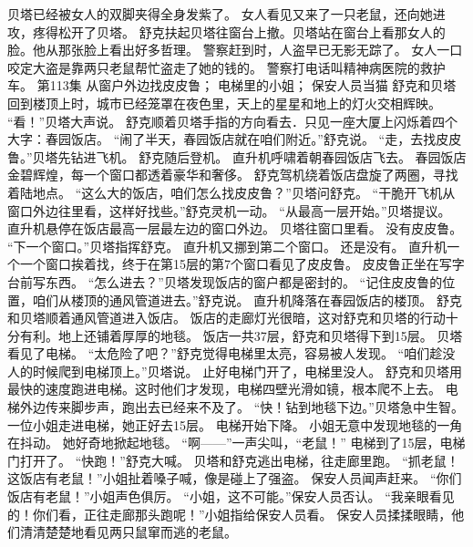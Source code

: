 \documentclass[a4paper,12pt,UTF8,twoside]{ctexbook}
\begin{document}
        贝塔已经被女人的双脚夹得全身发紫了。 
        女人看见又来了一只老鼠，还向她进攻，疼得松开了贝塔。 
        舒克扶起贝塔往窗台上撤。贝塔站在窗台上看那女人的脸。他从那张脸上看出好多哲理。 
        警察赶到时，人盗早已无影无踪了。 
        女人一口咬定大盗是靠两只老鼠帮忙盗走了她的钱的。 
        警察打电话叫精神病医院的救护车。   第113集 
        从窗户外边找皮皮鲁； 
        电梯里的小姐； 
        保安人员当猫   
        舒克和贝塔回到楼顶上时，城市已经笼罩在夜色里，天上的星星和地上的灯火交相辉映。 
        “看！”贝塔大声说。 
        舒克顺着贝塔手指的方向看去．只见一座大厦上闪烁着四个大字：春园饭店。 
        “闹了半天，春园饭店就在咱们附近。”舒克说。 
        “走，去找皮皮鲁。”贝塔先钻进飞机。 
        舒克随后登机。 
        直升机呼啸着朝春园饭店飞去。 
        春园饭店金碧辉煌，每一个窗口都透着豪华和奢侈。 
        舒克驾机绕着饭店盘旋了两圈，寻找着陆地点。 
        “这么大的饭店，咱们怎么找皮皮鲁？”贝塔问舒克。 
        “干脆开飞机从窗口外边往里看，这样好找些。”舒克灵机一动。 
        “从最高一层开始。”贝塔提议。 
        直升机悬停在饭店最高一层最左边的窗口外边。 
        贝塔往窗口里看。 
        没有皮皮鲁。 
        “下一个窗口。”贝塔指挥舒克。 
        直升机又挪到第二个窗口。 
        还是没有。 
        直升机一个一个窗口挨着找，终于在第15层的第7个窗口看见了皮皮鲁。 
        皮皮鲁正坐在写字台前写东西。 
        “怎么进去？”贝塔发现饭店的窗户都是密封的。 
        “记住皮皮鲁的位置，咱们从楼顶的通风管道进去。”舒克说。 
        直升机降落在春园饭店的楼顶。 
        舒克和贝塔顺着通风管道进入饭店。 
        饭店的走廊灯光很暗，这对舒克和贝塔的行动十分有利。地上还铺着厚厚的地毯。 
        饭店一共37层，舒克和贝塔得下到15层。 
        贝塔看见了电梯。 
        “太危险了吧？”舒克觉得电梯里太亮，容易被人发现。 
        “咱们趁没人的时候爬到电梯顶上。”贝塔说。 
        止好电梯门开了，电梯里没人。 
        舒克和贝塔用最快的速度跑进电梯。这时他们才发现，电梯四壁光滑如镜，根本爬不上去。 
        电梯外边传来脚步声，跑出去已经来不及了。 
        “快！钻到地毯下边。”贝塔急中生智。 
        一位小姐走进电梯，她正好去15层。 
        电梯开始下降。 
        小姐无意中发现地毯的一角在抖动。 
        她好奇地掀起地毯。 
        “啊——”一声尖叫，“老鼠！” 
        电梯到了15层，电梯门打开了。 
        “快跑！”舒克大喊。 
        贝塔和舒克逃出电梯，往走廊里跑。 
        “抓老鼠！这饭店有老鼠！”小姐扯着嗓子喊，像是碰上了强盗。 
        保安人员闻声赶来。 
        “你们饭店有老鼠！”小姐声色俱厉。 
        “小姐，这不可能。”保安人员否认。 
        “我亲眼看见的！你们看，正往走廊那头跑呢！”小姐指给保安人员看。 
        保安人员揉揉眼睛，他们清清楚楚地看见两只鼠窜而逃的老鼠。 
\end{document}
